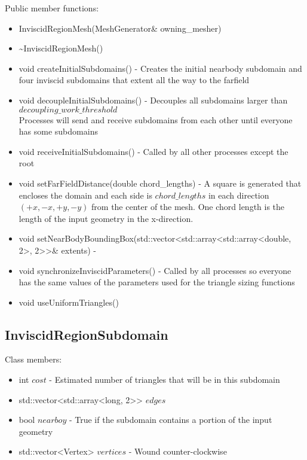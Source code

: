 \documentclass[manuscript, screen]{acmart}
\begin{document}
Public member functions:
\begin{itemize}
\item InviscidRegionMesh(MeshGenerator\& owning\_mesher)

\item \textasciitilde{}InviscidRegionMesh()
%

\item void createInitialSubdomains() - Creates the initial nearbody subdomain and four inviscid subdomains that extent all the way to the farfield

\item void decoupleInitialSubdomains() - Decouples all subdomains larger than $decoupling\_work\_threshold$\\
Processes will send and receive subdomains from each other until everyone has some subdomains

\item void receiveInitialSubdomains() - Called by all other processes except the root

\item void setFarFieldDistance(double chord\_lengths) - A square is generated that encloses the domain and each side is $chord\_lengths$ in each direction $(+x, -x, +y, -y)$ from the center of the mesh. One chord length is the length of the input geometry in the x-direction. 

\item void setNearBodyBoundingBox(std::vector<std::array<std::array<double, 2>, 2>>\& extents) - 

\item void synchronizeInviscidParameters() - Called by all processes so everyone has the same values of the parameters used for the triangle sizing functions

\item void useUniformTriangles()
\end{itemize}

\subsection{InviscidRegionSubdomain}

Class members:
\begin{itemize}
\item int $cost$ - Estimated number of triangles that will be in this subdomain
\item std::vector<std::array<long, 2>> $edges$
\item bool $nearboy$ - True if the subdomain contains a portion of the input geometry
\item std::vector<Vertex> $vertices$ - Wound counter-clockwise
\end{itemize}
\end{document}
